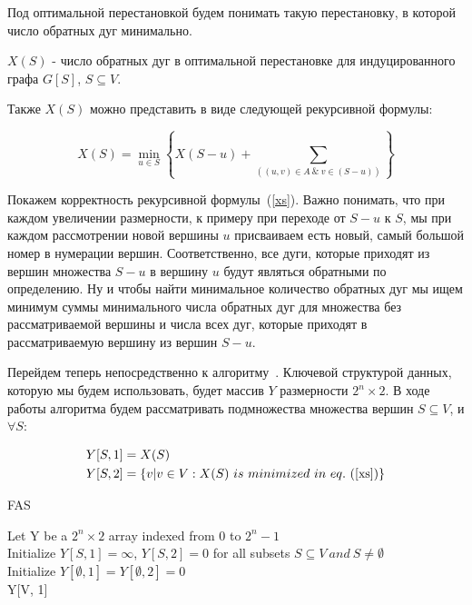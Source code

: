 Под оптимальной перестановкой будем понимать такую перестановку, в которой
число обратных дуг минимально.

\begin{definition}
    $X(S)$ - число обратных дуг в оптимальной перестановке для индуцированного 
    графа $G[S]$, $S \subseteq V$.
\end{definition}

Также $X(S)$ можно представить в виде следующей рекурсивной формулы:

\begin{equation}\label{xs}
    X(S) = \min\limits_{u\in S}{\left\{ X(S - u) +
    \sum\limits_{((u, v) \in A ~\&~ v\in (S-u))} \right\} }
\end{equation}

Покажем корректность рекурсивной формулы~(\ref{xs}). 
Важно понимать, что при каждом увеличении размерности, к примеру при переходе
от $S-u$ к $S$, мы при каждом рассмотрении новой вершины $u$ присваиваем есть
новый, самый большой номер в нумерации вершин. Соответственно, все дуги,
которые приходят из вершин множества $S-u$ в вершину $u$ будут являться
обратными по определению. Ну и чтобы найти минимальное количество обратных дуг
мы ищем минимум суммы минимального числа обратных дуг для множества без 
рассматриваемой вершины и числа всех дуг, которые приходят в рассматриваемую
вершину из вершин $S-u$.

Перейдем теперь непосредственно к алгоритму~\cite{exact_alg}. Ключевой структурой данных, 
которую мы будем использовать, будет массив $Y$ размерности $2^n \times 2$.
В ходе работы алгоритма будем рассматривать подмножества множества вершин
$S \subseteq V$, и $\forall S$:

\begin{align*}
    Y[S, 1] &= X(S) \\
    Y[S, 2] &= \{v | v \in V: X(S)~is~minimized~in~eq.~(\ref{xs})\}
\end{align*}

\begin{algorithm}[hbt!]

\caption{FAS}\label{alg:two}

    Let Y be a $2^n \times 2$ array indexed from 0 to $2^n - 1$ \\
    Initialize $Y[S, 1] =\infty$, $Y[S, 2] = 0$ for all subsets
    $S \subseteq V ~and~ S \neq \emptyset$ \\
    Initialize $Y[\emptyset, 1] = Y[\emptyset, 2] = 0$ \\
    \Return Y[V, 1]
\end{algorithm}


